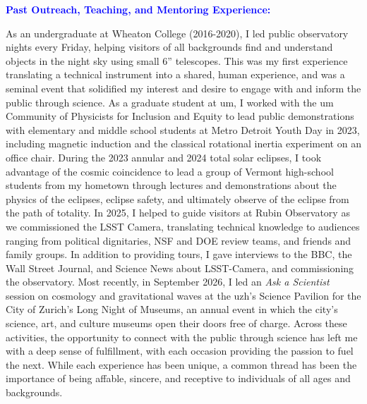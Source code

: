 \documentclass[11pt]{article}
\newcommand{\TODO}[1]{%
  \marginnote{\color{red}\textbf{TODO}}%
  {\color{red}#1}%
}
\newcommand{\statement}[1]{\par\medskip
  \textcolor{blue}{\textbf{#1:}}%
}
\begin{document}
\statement{Past Outreach, Teaching, and Mentoring Experience}
As an undergraduate at Wheaton College (2016-2020), I led public observatory nights every Friday, helping visitors of all backgrounds find and understand objects in the night sky using small 6'' telescopes. This was my first experience translating a technical instrument into a shared, human experience, and was a seminal event that solidified my interest and desire to engage with and inform the public through science. 
As a graduate student at \ac{um}, I worked with the \ac{um} Community of Physicists for Inclusion and Equity to lead public demonstrations with elementary and middle school students at Metro Detroit Youth Day in 2023, including magnetic induction and the classical rotational inertia experiment on an office chair.
During the 2023 annular and 2024 total solar eclipses, I took advantage of the cosmic coincidence to lead a group of Vermont high-school students from my hometown through lectures and demonstrations about the physics of the eclipses, eclipse safety, and ultimately observe of the eclipse from the path of totality. 
In 2025, I helped to guide visitors at Rubin Observatory as we commissioned the LSST Camera, translating technical knowledge to audiences ranging from political dignitaries, NSF and DOE review teams, and friends and family groups. In addition to providing tours, I gave interviews to the BBC, the Wall Street Journal, and Science News about LSST-Camera, and commissioning the observatory.
Most recently, in September 2026, I led an \textit{Ask a Scientist} session on cosmology and gravitational waves at the \ac{uzh}'s Science Pavilion for the City of Zurich's Long Night of Museums, an annual event in which the city's science, art, and culture museums open their doors free of charge.
Across these activities, the opportunity to connect with the public through science has left me with a deep sense of fulfillment, with each occasion providing the passion to fuel the next. While each experience has been unique, a common thread has been the importance of being affable, sincere, and receptive to individuals of all ages and backgrounds.

\end{document}
